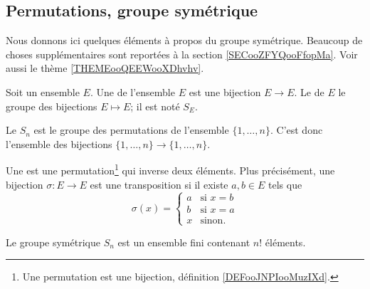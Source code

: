 \subsection{Permutations, groupe symétrique}

Nous donnons ici quelques éléments à propos du groupe symétrique. Beaucoup de choses supplémentaires sont reportées à la section \ref{SECooZFYQooFfopMa}. Voir aussi le thème \ref{THEMEooQEEWooXDhvhv}.

\begin{definition}      \label{DEFooJNPIooMuzIXd}
    Soit un ensemble \( E\). Une  de l'ensemble \( E\) est une bijection \( E\to E\). Le  de \( E\) le groupe des bijections \( E\mapsto E\); il est noté \( S_E\).

    Le  \( S_n\) est le groupe des permutations de l'ensemble \( \{ 1,\ldots,n \}\). C'est donc l'ensemble des bijections \( \{ 1,\ldots, n \}\to\{ 1,\ldots, n \}\).
\end{definition}


\begin{definition}      \label{DEFooXNAFooGTbTTJ}
    Une  est une permutation\footnote{Une permutation est une bijection, définition \ref{DEFooJNPIooMuzIXd}.} qui inverse deux éléments. Plus précisément, une bijection \( \sigma\colon E\to E\) est une transposition si il existe \( a,b\in E\) tels que
    \begin{equation}
        \sigma(x)=\begin{cases}
              a  &   \text{si } x=b\\
            b    &   \text{si } x=a\\
            x    &    \text{sinon. }
        \end{cases}
    \end{equation}
\end{definition}

\begin{lemma}        \label{LEMooSGWKooKFIDyT}
    Le groupe symétrique \( S_n\) est un ensemble fini contenant \( n!\) éléments.
\end{lemma}

